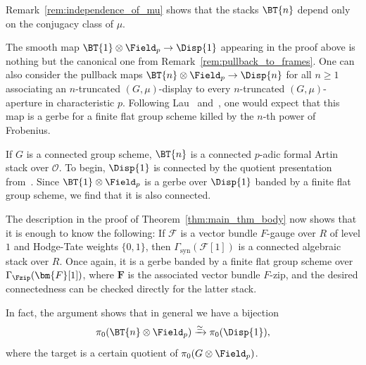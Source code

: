 \documentclass[10pt]{amsart}
\begin{document}
\begin{remark}
Remark~\ref{rem:independence_of_mu} shows that the stacks $\BT{n}$ depend only on the conjugacy class of $\mu$. 
\end{remark}

\begin{remark}
The smooth map $\BT{1}\otimes\Field_p\to \Disp{1}$ appearing in the proof above is nothing but the canonical one from Remark~\ref{rem:pullback_to_frames}. One can also consider the pullback maps $\BT{n}\otimes\Field_p\to \Disp{n}$ for all $n\ge 1$ associating an $n$-truncated $(G,\mu)$-display to every $n$-truncated $(G,\mu)$-aperture in characteristic $p$. Following Lau~\cite{MR2983008} and~\cite{drinfeld2024laugroupscheme}, one would expect that this map is a gerbe for a finite flat group scheme killed by the $n$-th power of Frobenius. 
\end{remark}

\begin{remark}
\label{rem:connectedness}
If $G$ is a connected group scheme, $\BT{n}$ is a connected $p$-adic formal Artin stack over $\mathcal{O}$. To begin, $\Disp{1}$ is connected by the quotient presentation from~\cite[Proposition 3.11]{Pink2015-ye}. Since $\BT{1}\otimes\Field_p$ is a gerbe over $\Disp{1}$ banded by a finite flat group scheme, we find that it is also connected. 

The description in the proof of Theorem~\ref{thm:main_thm_body} now shows that it is enough to know the following: If $\mathcal{F}$ is a vector bundle $F$-gauge over $R$ of level $1$ and Hodge-Tate weights $\{0,1\}$, then $\Gamma_{\mathrm{syn}}(\mathcal{F}[1])$ is a connected algebraic stack over $R$. Once again, it is a gerbe banded by a finite flat group scheme over $\Gamma_{\Fzip}(\bm{F}[1])$, where $\bm{F}$ is the associated vector bundle $F$-zip, and the desired connectedness can be checked directly for the latter stack.

In fact, the argument shows that in general we have a bijection
\[
\pi_0(\BT{n}\otimes\Field_p)\xrightarrow{\simeq}\pi_0(\Disp{1}),
\]
where the target is a certain quotient of $\pi_0(G\otimes\Field_p)$.
\end{remark}   
\end{document}
